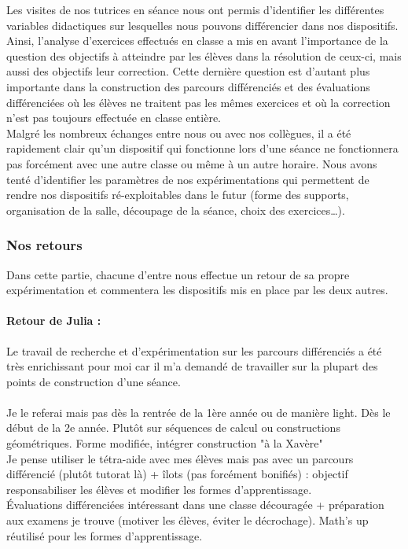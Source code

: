 Les visites de nos tutrices en séance nous ont permis d'identifier les différentes variables didactiques sur lesquelles nous pouvons différencier dans nos dispositifs. Ainsi, l'analyse d'exercices effectués en classe a mis en avant l'importance de la question des objectifs à atteindre par les élèves dans la résolution de ceux-ci, mais aussi des objectifs leur correction. Cette dernière question est d'autant plus importante dans la construction des parcours différenciés et des évaluations différenciées où les élèves ne traitent pas les mêmes exercices et où la correction n'est pas toujours effectuée en classe entière.\\
Malgré les nombreux échanges entre nous ou avec nos collègues, il a été rapidement clair qu'un dispositif qui fonctionne lors d'une séance ne fonctionnera pas forcément avec une autre classe ou même à un autre horaire. Nous avons tenté d'identifier les paramètres de nos expérimentations qui permettent de rendre nos dispositifs ré-exploitables dans le futur (forme des supports, organisation de la salle, découpage de la séance, choix des exercices\ldots).

\subsubsection{Nos retours}
Dans cette partie, chacune d'entre nous effectue un retour de sa propre expérimentation et commentera les dispositifs mis en place par les deux autres. \\
\paragraph*{Retour de Julia :} 
Le travail de recherche et d'expérimentation sur les parcours différenciés a été très enrichissant pour moi car il m'a demandé de travailler sur la plupart des points de construction d'une séance. \\
\\
Je le referai mais pas dès la rentrée de la 1ère année ou de manière light. Dès le début de la 2e année. Plutôt sur séquences de calcul ou constructions géométriques. Forme modifiée, intégrer construction "à la Xavère"\\
Je pense utiliser le tétra-aide avec mes élèves mais pas avec un parcours différencié (plutôt tutorat là) + îlots (pas forcément bonifiés) : objectif responsabiliser les élèves et modifier les formes d'apprentissage.\\
Évaluations différenciées intéressant dans une classe découragée + préparation aux examens je trouve (motiver les élèves, éviter le décrochage).
Math's up réutilisé pour les formes d'apprentissage.

